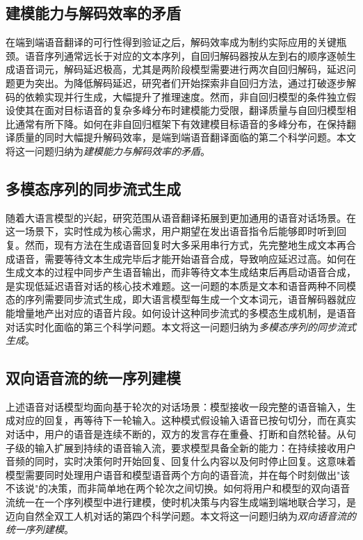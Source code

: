 \subsection{建模能力与解码效率的矛盾}

在端到端语音翻译的可行性得到验证之后，解码效率成为制约实际应用的关键瓶颈。语音序列通常远长于对应的文本序列，自回归解码器按从左到右的顺序逐帧生成语音词元，解码延迟极高，尤其是两阶段模型需要进行两次自回归解码，延迟问题更为突出。为降低解码延迟，研究者们开始探索非自回归方法，通过打破逐步解码的依赖实现并行生成，大幅提升了推理速度。然而，非自回归模型的条件独立假设使其在面对目标语音的复杂多峰分布时建模能力受限，翻译质量与自回归模型相比通常有所下降。如何在非自回归框架下有效建模目标语音的多峰分布，在保持翻译质量的同时大幅提升解码效率，是端到端语音翻译面临的第二个科学问题。本文将这一问题归纳为\textit{建模能力与解码效率的矛盾}。

\subsection{多模态序列的同步流式生成}

随着大语言模型的兴起，研究范围从语音翻译拓展到更加通用的语音对话场景。在这一场景下，实时性成为核心需求，用户期望在发出语音指令后能够即时听到回复。然而，现有方法在生成语音回复时大多采用串行方式，先完整地生成文本再合成语音，需要等待文本生成完毕后才能开始语音合成，导致响应延迟过高。如何在生成文本的过程中同步产生语音输出，而非等待文本生成结束后再启动语音合成，是实现低延迟语音对话的核心技术难题。这一问题的本质是文本和语音两种不同模态的序列需要同步流式生成，即大语言模型每生成一个文本词元，语音解码器就应能增量地产出对应的语音片段。如何设计这种同步流式的多模态生成机制，是语音对话实时化面临的第三个科学问题。本文将这一问题归纳为\textit{多模态序列的同步流式生成}。

\subsection{双向语音流的统一序列建模}

上述语音对话模型均面向基于轮次的对话场景：模型接收一段完整的语音输入，生成对应的回复，再等待下一轮输入。这种模式假设输入语音已按句切分，而在真实对话中，用户的语音是连续不断的，双方的发言存在重叠、打断和自然轮替。从句子级的输入扩展到持续的语音输入流，要求模型具备全新的能力：在持续接收用户音频的同时，实时决策何时开始回复、回复什么内容以及何时停止回复。这意味着模型需要同时处理用户语音和模型语音两个方向的语音流，并在每个时刻做出"该不该说"的决策，而非简单地在两个轮次之间切换。如何将用户和模型的双向语音流统一在一个序列模型中进行建模，使时机决策与内容生成端到端地联合学习，是迈向自然全双工人机对话的第四个科学问题。本文将这一问题归纳为\textit{双向语音流的统一序列建模}。



